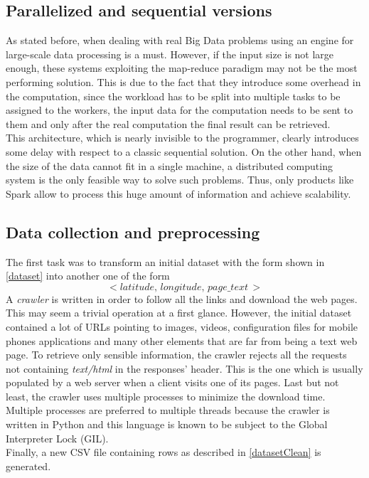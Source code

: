 \documentclass{sig-alternate-05-2015}
\begin{document}
\subsection{Parallelized and sequential versions}
As stated before, when dealing with real Big Data problems using an engine for large-scale data processing is a must. However, if the input size is not large enough, these systems exploiting the map-reduce paradigm may not be the most performing solution. This is due to the fact that they introduce some overhead in the computation, since the workload has to be split into multiple tasks to be assigned to the workers, the input data for the computation needs to be sent to them and only after the real computation the final result can be retrieved.\\
This architecture, which is nearly invisible to the programmer, clearly introduces some delay with respect to a classic sequential solution. On the other hand, when the size of the data cannot fit in a single machine, a distributed computing system is the only feasible way to solve such problems. Thus, only products like Spark allow to process this huge amount of information and achieve scalability.
\subsection{Data collection and preprocessing}\label{preprocessing}
The first task was to transform an initial dataset with the form shown in \ref{dataset} into another one of the form
\begin{equation}\label{datasetClean}
    <latitude,\,longitude,\,page\_text\,>
\end{equation}
A \emph{crawler} is written in order to follow all the links and download the web pages. This may seem a trivial operation at a first glance. However, the initial dataset contained a lot of URLs pointing to images, videos, configuration files for mobile phones applications and many other elements that are far from being a text web page. To retrieve only sensible information, the crawler rejects all the requests not containing \emph{text/html} in the responses' header. This is the one which is usually populated by a web server when a client visits one of its pages. Last but not least, the crawler uses multiple processes to minimize the download time. Multiple processes are preferred to multiple threads because the crawler is written in Python and this language is known to be subject to the Global Interpreter Lock\cite{gil} (GIL).\\
Finally, a new CSV file containing rows as described in \ref{datasetClean} is generated.
\end{document}
